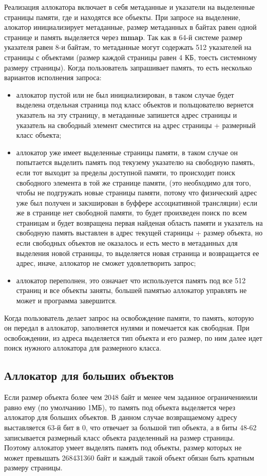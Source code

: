 Реализация аллокатора включает в себя метаданные и указатели на выделенные страницы памяти, где и находятся все объекты. При запросе на выделение, алокатор инициализирует метаданные, размер метаданных в байтах равен одной странице и память выделяется через \textbf{mmap}. Так как в 64-й системе размер указателя равен 8-и байтам, то метаданные могут содержать 512 указателей на страницы с объектами (размер каждой страницы равен 4 КБ, тоесть системному размеру страницы). Когда пользователь запрашивает память, то есть несколько вариантов исполнения запроса:
\begin{itemize}
	\item аллокатор пустой или не был инициализирован, в таком случае будет выделена отдельная страница под класс объектов и польщователю вернется указатель на эту страницу, в метаданные запишется адрес страницы и указатель на свободный элемент сместится на адрес страницы + размерный класс объекта;
	\item аллокатор уже имеет выделенные страницы памяти, в таком случае он попытается выделить память под текузему указателю на свободную память, если тот выходит за пределы доступной памяти, то происходит поиск свободного элемента в той же странице памяти, (это необходимо для того, чтобы не подгружать новые страницы памяти, потому что физический адрес уже был получен и закэширован в буффере ассоциативной трансляции) если же в странице нет свободной памяти, то будет проихведен поиск по всем страницам и будет возвращена первая найденая область памяти и указатель на свободную память выставлен в адрес текущей старницы + размер объекта, но если свободных объектов не оказалось и есть место в метаданных для выделения новой страницы, то выделяется новая страница и возвращается ее адрес, иначе, аллокатор не сможет удовлетворить запрос;
	\item аллокатор переполнен, это означает что используется память под все 512 страниц и все объекты заняты, большей памятью аллокатор управлять не может и программа завершится.
\end{itemize}

Когда пользователь делает запрос на освобождение памяти, то память, которую он передал в аллокатор, заполняется нулями и помечается как свободная. При освобождении, из адреса выделяется тип объекта и его размер, по ним далее идет поиск нужного аллокатора для размерного класса.

\subsection{Аллокатор для больших объектов}
Если размер объекта более чем 2048 байт и менее чем заданное ограничениеили равно ему (по умолчанию 1МБ), то память под объекта выделяется через аллокатор для больших объектов. В данном случае возвращаемому адресу выставляется 63-й бит в 0, что отвечает за большой тип объекта, а в биты 48-62 записывается размерный класс объекта разделенный на размер страницы. Поэтому аллокатор умеет выделять память под объекты, размер которых не может превышать 268431360 байт и каждый такой объект обязан быть кратным размеру страницы.

